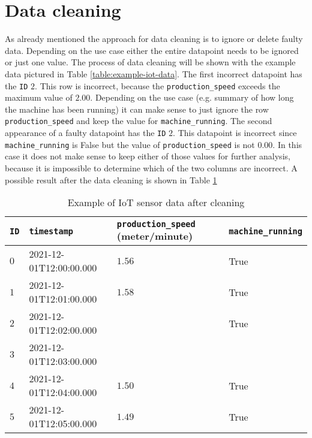 \section{Data cleaning}
As already mentioned the approach for data cleaning is to ignore or delete faulty data. Depending on the use case either the entire datapoint needs to be ignored or just one value. The process of data cleaning will be shown with the example data pictured in Table \ref{table:example-iot-data}.
The first incorrect datapoint has the \verb|ID| $2$. This row is incorrect, because the \verb|production_speed| exceeds the maximum value of $2.00$. Depending on the use case (e.g. summary of how long the machine has been running) it can make sense to just ignore the row \verb|production_speed| and keep the value for \verb|machine_running|. The second appearance of a faulty datapoint has the \verb|ID| $2$. This datapoint is incorrect since \verb|machine_running| is False but the value of \verb|production_speed| is not $0.00$. In this case it does not make sense to keep either of those values for further analysis, because it is impossible to determine which of the two columns are incorrect. A possible result after the data cleaning is shown in Table \ref{table:example-iot-data-after-cleaning}
\begin{table}[ht]
\begin{tabular}{|l|l|l|l|}
\hline
\verb|ID| & \verb|timestamp|        & \verb|production_speed| (meter/minute) & \verb|machine_running| \\ \hline
$0$       & 2021-12-01T12:00:00.000 & $1.56$                                 & True                   \\ \hline
$1$       & 2021-12-01T12:01:00.000 & $1.58$                                 & True                   \\ \hline
$2$       & 2021-12-01T12:02:00.000 &                                        & True                   \\ \hline
$3$       & 2021-12-01T12:03:00.000 &                                        &                        \\ \hline
$4$       & 2021-12-01T12:04:00.000 & $1.50$                                 & True                   \\ \hline
$5$       & 2021-12-01T12:05:00.000 & $1.49$                                 & True                   \\ \hline
\end{tabular}
\caption{Example of IoT sensor data after cleaning}
\label{table:example-iot-data-after-cleaning}
\end{table}


